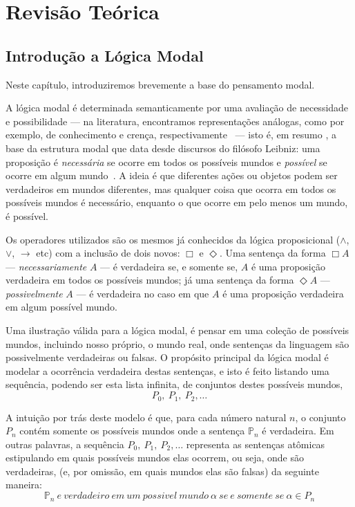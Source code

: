 \chapter{Revisão Teórica}
\section{Introdução a Lógica Modal}
\label{sec:l_gica_modal}
Neste capítulo, introduziremos brevemente a base do pensamento modal. 

A lógica modal é determinada semanticamente por uma avaliação de necessidade e
possibilidade --- na literatura, encontramos representações análogas, como por
exemplo, de conhecimento e crença, respectivamente~\cite{artigoquefaladeknowledgeebelief} --- isto é, em resumo %
, a base da estrutura
modal que data desde discursos do filósofo Leibniz: uma proposição é
\textit{necessária} se ocorre em todos os possíveis mundos e \textit{possível}
se ocorre em algum mundo~\cite{chellas:modal_logic}.  A ideia é que
diferentes ações ou objetos podem ser verdadeiros em mundos diferentes, mas
qualquer coisa que
ocorra em todos os possíveis mundos é necessário, enquanto o que ocorre em pelo
menos um mundo, é possível.


Os operadores utilizados são os mesmos já conhecidos da lógica proposicional
($\wedge$, $\vee$, $\rightarrow$ etc) com a inclusão de dois novos: $\Box$ e
$\Diamond$.
Uma sentença da forma $\Box A$ --- \textit{necessariamente} $A$ --- é verdadeira se,
e somente se, $A$ é uma proposição verdadeira em todos os possíveis mundos; já
uma sentença da forma $\Diamond A$ --- \textit{possivelmente} $A$ --- é verdadeira
no caso em que $A$ é uma proposição verdadeira em algum possível mundo.

Uma ilustração válida para a lógica modal, é pensar em uma coleção de possíveis
mundos, incluindo nosso próprio, o mundo real, onde sentenças da linguagem são
possivelmente verdadeiras ou falsas. O propósito principal da lógica modal é
modelar a ocorrência verdadeira destas sentenças, e isto é feito listando uma
sequência, podendo ser esta lista infinita, de conjuntos destes possíveis mundos,
\begin{equation}
    P_0,\ P_1,\ P_2,\ldots
\end{equation}

A intuição por trás deste modelo é que, para cada número natural $n$, o conjunto
$P_n$ contém somente os possíveis mundos onde a sentença $\mathbb{P}_n$ é
verdadeira. Em outras palavras, a sequência 
$P_0,\ P_1,\ P_2,\ldots$
representa as sentenças at\^omicas estipulando em quais possíveis mundos elas
ocorrem, ou seja, onde são verdadeiras,
(e, por omissão, em quais mundos elas são falsas) da seguinte maneira:
\begin{equation}
    \mathbb{P}_n\ e\ verdadeiro\ em\ um\ possivel\ mundo\ \alpha\ se\ e\
    somente\ se\
    \alpha \in P_n 
\end{equation}

